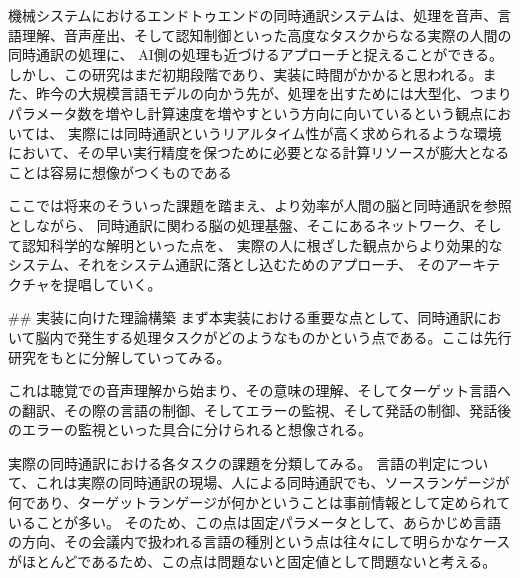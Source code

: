 機械システムにおけるエンドトゥエンドの同時通訳システムは、処理を音声、言語理解、音声産出、そして認知制御といった高度なタスクからなる実際の人間の同時通訳の処理に、
AI側の処理も近づけるアプローチと捉えることができる。しかし、この研究はまだ初期段階であり、実装に時間がかかると思われる。また、昨今の大規模言語モデルの向かう先が、処理を出すためには大型化、つまりパラメータ数を増やし計算速度を増やすという方向に向いているという観点においては、
実際には同時通訳というリアルタイム性が高く求められるような環境において、その早い実行精度を保つために必要となる計算リソースが膨大となることは容易に想像がつくものである

ここでは将来のそういった課題を踏まえ、より効率が人間の脳と同時通訳を参照としながら、
同時通訳に関わる脳の処理基盤、そこにあるネットワーク、そして認知科学的な解明といった点を、
実際の人に根ざした観点からより効果的なシステム、それをシステム通訳に落とし込むためのアプローチ、
そのアーキテクチャを提唱していく。


## 実装に向けた理論構築
まず本実装における重要な点として、同時通訳において脳内で発生する処理タスクがどのようなものかという点である。ここは先行研究をもとに分解していってみる。

これは聴覚での音声理解から始まり、その意味の理解、そしてターゲット言語への翻訳、その際の言語の制御、そしてエラーの監視、そして発話の制御、発話後のエラーの監視といった具合に分けられると想像される。

実際の同時通訳における各タスクの課題を分類してみる。
言語の判定について、これは実際の同時通訳の現場、人による同時通訳でも、ソースランゲージが何であり、ターゲットランゲージが何かということは事前情報として定められていることが多い。
そのため、この点は固定パラメータとして、あらかじめ言語の方向、その会議内で扱われる言語の種別という点は往々にして明らかなケースがほとんどであるため、この点は問題ないと固定値として問題ないと考える。